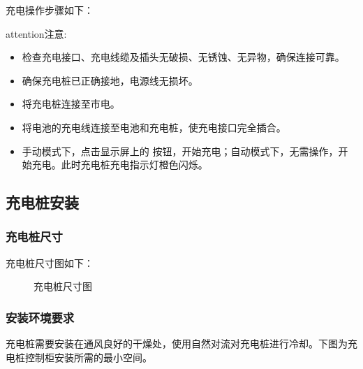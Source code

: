 \documentclass[a4paper,11pt,english,openany,oneside]{sphinxmanual}
\begin{document}
\sphinxAtStartPar
{} 充电操作步骤如下：

\begin{sphinxadmonition}{attention}{注意:}\begin{itemize}
\item {} 
\sphinxAtStartPar
检查充电接口、充电线缆及插头无破损、无锈蚀、无异物，确保连接可靠。

\item {} 
\sphinxAtStartPar
确保充电桩已正确接地，电源线无损坏。

\end{itemize}
\end{sphinxadmonition}
\begin{itemize}
\item {} 
\sphinxAtStartPar
将充电桩连接至市电。

\item {} 
\sphinxAtStartPar
将电池的充电线连接至电池和充电桩，使充电接口完全插合。

\item {} 
\sphinxAtStartPar
手动模式下，点击显示屏上的  按钮，开始充电；自动模式下，无需操作，开始充电。此时充电桩充电指示灯橙色闪烁。

\end{itemize}


\subsection{充电桩安装}
\label{\detokenize{_u9009_u914d_u8bbe_u5907:id20}}\label{\detokenize{_u9009_u914d_u8bbe_u5907:id21}}

\subsubsection{充电桩尺寸}
\label{\detokenize{_u9009_u914d_u8bbe_u5907:id22}}\label{\detokenize{_u9009_u914d_u8bbe_u5907:id23}}
\sphinxAtStartPar
充电桩尺寸图如下：

\begin{figure}[H]
\centering
\capstart

\noindent{}
\caption{充电桩尺寸图}\label{\detokenize{_u9009_u914d_u8bbe_u5907:id38}}\end{figure}


\subsubsection{安装环境要求}
\label{\detokenize{_u9009_u914d_u8bbe_u5907:id24}}\label{\detokenize{_u9009_u914d_u8bbe_u5907:id25}}
\sphinxAtStartPar
充电桩需要安装在通风良好的干燥处，使用自然对流对充电桩进行冷却。下图为充电桩控制柜安装所需的最小空间。
\end{document}
